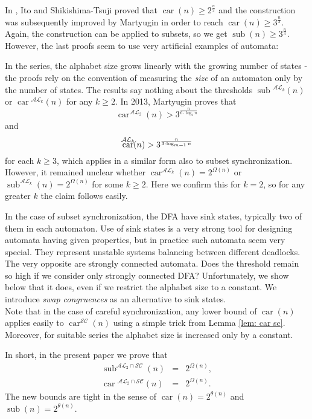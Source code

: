 \documentclass{ws-ijmpc}
\DeclareMathOperator{\car}{car}
\DeclareMathOperator{\sub}{sub}
\begin{document}
In \citep{ITO1short}, Ito and Shikishima-Tsuji proved that $\car\!\left(n\right)\ge2^{\frac{n}{2}}$
and the construction was subsequently improved by Martyugin \citep{MAR6}
in order to reach $\car\!\left(n\right)\geq3^{\frac{n}{3}}$. Again,
the construction can be applied to subsets, so we get $\sub\!\left(n\right)\geq3^{\frac{n}{3}}$.
However, the last proofs seem to use very artificial examples of automata:
\begin{itemlist}
\item In the series, the alphabet size grows linearly with the growing number
of states - the proofs rely on the convention of measuring the \emph{size
}of an automaton only by the number of states. The results say nothing
about the thresholds $\sub{}^{\mathcal{AL}_{k}}\!\left(n\right)$
or $\car{}^{\mathcal{AL}_{k}}\!\left(n\right)$ for any $k\ge2$.
In 2013, Martyugin \citep{MAR5} proves that
\[
\car^{\mathcal{AL}_{2}}\!(n)>3^{\frac{n}{6\cdot\log_{2}n}}
\]
and 
\[
\car^{\mathcal{AL}_{k}}\!(n)>3^{\frac{n}{3\cdot\log_{m\text{\textminus}1}n}}
\]
for each $k\ge3$, which applies in a similar form also to subset
synchronization. However, it remained unclear whether $\car^{\mathcal{AL}_{k}}\!\left(n\right)=2^{\Omega\left(n\right)}$
or $\sub^{\mathcal{AL}_{k}}\!\left(n\right)=2^{\Omega\left(n\right)}$
for some $k\ge2$. Here we confirm this for $k=2$, so for any greater
$k$ the claim follows easily.
\item In the case of subset synchronization, the DFA have sink states, typically
two of them in each automaton. Use of sink states is a very strong
tool for designing automata having given properties, but in practice
such automata seem very special. They represent unstable systems balancing
between different deadlocks. The very opposite are strongly connected\emph{
}automata. Does the threshold remain so high if we consider only strongly
connected DFA? Unfortunately, we show below that it does, even if
we restrict the alphabet size to a constant. We introduce \emph{swap
congruences} as an alternative to sink states. \\
Note that in the case of careful synchronization, any lower bound
of $\car\!\left(n\right)$ applies easily to $\car^{\mathcal{SC}}\!\left(n\right)$
using a simple trick from Lemma \ref{lem: car sc}. Moreover, for
suitable series the alphabet size is increased only by a constant.
\end{itemlist}
In short, in the present paper we prove that
\begin{eqnarray*}
\sub^{\mathcal{AL}_{2}\cap\mathcal{SC}}\!\left(n\right) & = & 2^{\Omega\left(n\right)},\\
\car{}^{\mathcal{AL}_{2}\cap\mathcal{SC}}\!\left(n\right) & = & 2^{\Omega\left(n\right)}.
\end{eqnarray*}
The new bounds are tight in the sense of $\car\!\left(n\right)=2^{\theta\left(n\right)}$
and $\sub\!\left(n\right)=2^{\mathcal{\theta}\left(n\right)}$.
\end{document}
